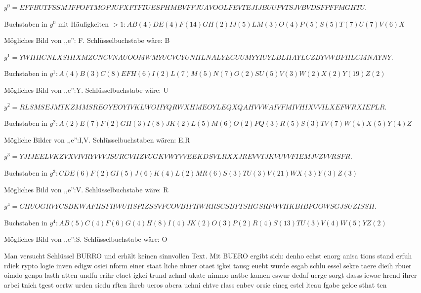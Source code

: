 \documentclass[a4paper]{article}
\begin{document}
\begin{multicols}{3}
    \begin{itemize*}
        \item $y^0 =EFFBUTFSSMJFPOFTMOPJUFXFTFTUESPHMBVFFJUAVOOLFEVTEJIJBUUPVTSJVBVDSFPFFMGHTU$.
        \item Buchstaben in $y^0$ mit Häufigkeiten $>1:AB(4)DE(4)F(14)GH(2)IJ(5)LM(3)O(4)P(5)S(5)T(7)U(7)V(6)X$
        \item Mögliches Bild von ,,e'': F. Schlüsselbuchstabe wäre: B
        \item $y^1 =YWHHCNLXSIHXMZCNCVNAUOOMWMYUCVCYUNHLNALYECUUMYYIUYLBLHAYLCZBYVWBFHLCMNAYNY$.
        \item Buchstaben in $y^1:A(4)B(3)C(8)EFH(6)I(2)L(7)M(5)N(7)O(2)SU(5)V(3)W(2)X(2)Y(19)Z(2)$
        \item Mögliches Bild von ,,e'':Y. Schlüsselbuchstabe wäre: U
        \item $y^2 =RLSMSEJMTKZMMSREGYEOYIVKLWOIIYQRWXHMEOYLEQXQAHVVWAIVFMIVHIXVVILXEFWRXIEPLR$.
        \item Buchstaben in $y^2:A(2)E(7)F(2)GH(3)I(8)JK(2)L(5)M(6)O(2)PQ(3)R(5)S(3)TV(7)W(4)X(5)Y(4)Z$
        \item Mögliche Bilder von ,,e'':I,V. Schlüsselbuchstaben wären: E,R
        \item $y^3 =YJIJEELVKZVXVIVRYVVVJSURCVIIZVUGKVWYVVEEKDSVLRXXJREVVTJKVUVVFIEMJVZVVRSFR$.
        \item Buchstaben in $y^3 :CDE(6)F(2)GI(5)J(6)K(4)L(2)MR(6)S(3)TU(3)V(21)WX(3)Y(3)Z(3)$
        \item Mögliches Bild von ,,e'':V. Schlüsselbuchstabe wäre: R
        \item $y^4 =CHUOGRVYCSBKWAFHSFHWUHSPIZSSVFCOVBIFHWRRSCSBFTSHGSRFWVHKBIBPGOWSGJSUZISSH$.
        \item Buchstaben in $y^4 :AB(5)C(4)F(6)G(4)H(8)I(4)JK(2)O(3)P(2)R(4)S(13)TU(3)V(4)W(5)YZ(2)$
        \item Mögliches Bild von ,,e'':S. Schlüsselbuchstabe wäre: O
    \end{itemize*}

    Man versucht Schlüssel BURRO und erhält keinen sinnvollen Text. Mit BUERO ergibt sich:
    denho echst enorg anisa tions stand erfuh rdiek rypto logie
    inven edigw osiei nform einer staat liche nbuer otaet igkei
    tausg euebt wurde esgab schlu essel sekre taere dieih rbuer
    oimdo genpa lasth atten undfu erihr etaet igkei trund zehnd
    ukate nimmo natbe kamen eswur dedaf uerge sorgt dasss iewae
    hrend ihrer arbei tnich tgest oertw urden siedu rften ihreb
    ueros abera uchni chtve rlass enbev orsie eineg estel lteau
    fgabe geloe sthat ten


\end{multicols}
\end{document}
